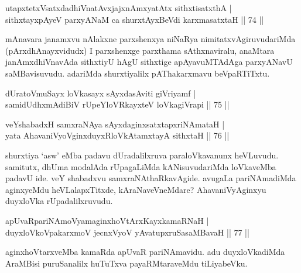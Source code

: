 
\begin{shl}
utapxtetxVsatxdadhiVnatAvxjajxnAmxyatAtx sithxtisatxthA | \\
sithxtayxpAyeV parxyANaM ca shurxtAyx\s BeVdi karxmasatxtaH \hfill|| 74 || 
\end{shl}

\begin{artha}
mAnavara janamxvu nAlakxne parxshenxya niNaRya nimitatxvAgiruvudariMda (pArxdhAnayxvidudx) I parxshenxge parxthama sAthxnaviralu, anaMtara janAmxdhiVnavAda sithxtiyU hAgU sithxtige apAyavuMTAdAga parxyANavU saMBavisuvudu. adariMda shurxtiyalilx pAThakarxmavu beVpaRTiTxtu.
\end{artha}


\begin{shl}
dUratoV\s muSayx loVkasayx sAyxdasAviti giVriyamf | \\
samidUdhxmAdiBiV rUpeYloVRkayxteV loVkagiVrapi \hfill|| 75 || 
\end{shl}

\begin{shl}
veYshabadxH samxraNAya sAyxdaginxsatxtapxriNAmataH | \\
yata AhavaniVyoV\s ginxduyxRloVkAtamxtayA sithxtaH \hfill|| 76 || 
\end{shl}

\begin{artha}
shurxtiya `asw' eMba padavu dUradalilxruva paraloVkavanunx heVLuvudu. 
samitutx, dhUma modalAda rUpagaLiMda kANisuvudariMda loVkaveMba padavU 
ide. veY shabadxvu samxraNAthaRkavAgide. avugaLa pariNAmadiMda 
aginxyeMdu heVLalapxTitxde, kAraNaveVneMdare? AhavaniVyAginxyu 
duyxloVka rUpadalilxruvudu.
\end{artha}


\begin{shl}
apUvaRpariNAmoV\s yamaginxhoVtArxKayxkamaRNaH | \\
duyxloVkoVpakarxmoV jecnxVyoV yAvatupxruSasaMBavaH \hfill|| 77 || 
\end{shl}

\begin{artha}
aginxhoVtarxveMba kamaRda apUvaR pariNAmavidu. adu duyxloVkadiMda 
AraMBisi puruSanalilx huTuTxva payaRMtaraveMdu tiLiyabeVku.
\end{artha}

